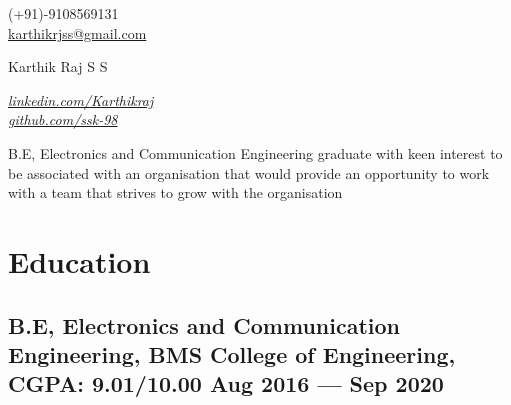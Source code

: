 \documentclass[a4,10pt]{article}
\begin{document}
\begin{center}
    \begin{minipage}[b]{0.24\textwidth}
           
            \large (+91)-9108569131 \\
            \large \href{mailto:karthikrjss@gmail.com}{karthikrjss@gmail.com} 
    \end{minipage}%
    \begin{minipage}[b]{0.5\textwidth}
            \centering
            {\HUGE Karthik Raj S S} \\ %
            \vspace{0.1cm}
    \end{minipage}%
    \begin{minipage}[b]{0.24\textwidth}
            
            \flushright \large  %
            \href{https://www.linkedin.com/in/karthik-raj-s-s-9669a9165}
            {\color{UI_blue}\emph{linkedin.com/Karthikraj}}\\
            \href{https://github.com/ssk-98}{\color{UI_blue}\emph{github.com/ssk-98}}
         
    \end{minipage}   
    
\vspace{-0.15cm} 
{\color{UI_blue} \hrulefill}
\end{center}
\vspace{-0.2cm}
B.E, Electronics and Communication Engineering graduate with keen interest to be associated with an organisation that would provide an opportunity to work with a team that strives to grow with the organisation\vspace{-0.2cm}

\section{Education }
\subsection*{B.E, Electronics and Communication Engineering, {\normalsize \normalfont BMS College of Engineering, CGPA: 9.01/10.00} \hfill Aug 2016 --- Sep 2020} 
\vspace{0.1cm}
\end{document}
